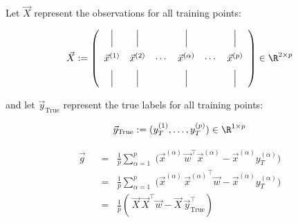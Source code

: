 \begin{frame}

Let $\vec X$ represent the observations for all training points:

\begin{equation}
\vec X := 
\left(
\begin{array}{cccccc}
\Big| & \Big| & & \Big| & & \Big| \\[3mm]
\vec x^{(1)} & \vec x^{(2)} & \cdots & \vec x^{(\alpha)} & \cdots & \vec x^{(p)}\\[2mm]
\Big| & \Big| & & \Big| & & \Big|
\end{array}
\right) \in \R^{2 \times p}
\end{equation}

and let $\vec y_{\text{True}}$ represent the true labels for all training points:

\begin{equation}
\vec y_{\text{True}} := (y_T^{(1)}, \ldots, y_T^{(p)}) \in \R^{1 \times p}
\end{equation}


\pause

\svspace{-3mm}

\begin{align}
\vec g
\;\;&=\;\;
\frac{1}{p} \sum_{\alpha=1}^{p} \;
\big( \vec x^{(\alpha)} \, \vec w^{\top}\vec x^{(\alpha)} - \vec x^{(\alpha)} y_{T}^{(\alpha)} \big)\\
\;\;&=\;\;
\frac{1}{p} \sum_{\alpha=1}^{p} \;
\big( \vec x^{(\alpha)} \, {\vec x^{(\alpha)}}^{\top} \vec w- \vec x^{(\alpha)} y_{T}^{(\alpha)} \big)\\
\;\;&=\;\;
\frac{1}{p} \left(\, \vec X \, \vec X^\top \vec w - \vec X\, \vec y_{\text{True}}^\top \right)
\end{align}

\end{frame}

